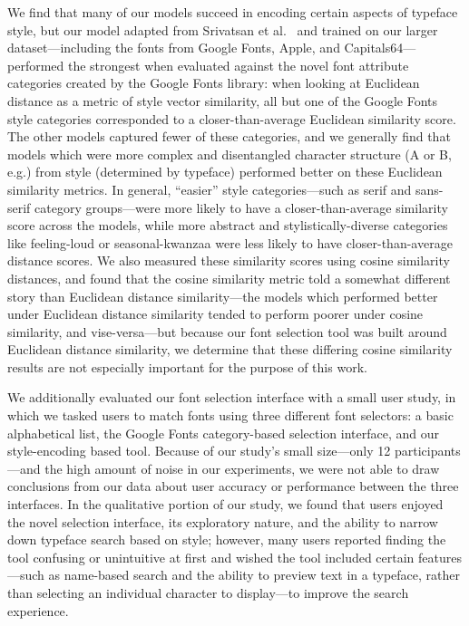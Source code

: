 We find that many of our models succeed in encoding certain aspects of typeface style, but our model adapted from Srivatsan et al.\ \cite{srivatsan2020} and trained on our larger dataset---including the fonts from Google Fonts, Apple, and Capitals64---performed the strongest when evaluated against the novel font attribute categories created by the Google Fonts library: when looking at Euclidean distance as a metric of style vector similarity, all but one of the Google Fonts style categories corresponded to a closer-than-average Euclidean similarity score. The other models captured fewer of these categories, and we generally find that models which were more complex and disentangled character structure (A or B, e.g.) from style (determined by typeface) performed better on these Euclidean similarity metrics. In general, ``easier'' style categories---such as serif and sans-serif category groups---were more likely to have a closer-than-average similarity score across the models, while more abstract and stylistically-diverse categories like feeling-loud or seasonal-kwanzaa were less likely to have closer-than-average distance scores. We also measured these similarity scores using cosine similarity distances, and found that the cosine similarity metric told a somewhat different story than Euclidean distance similarity---the models which performed better under Euclidean distance similarity tended to perform poorer under cosine similarity, and vise-versa---but because our font selection tool was built around Euclidean distance similarity, we determine that these differing cosine similarity results are not especially important for the purpose of this work.

We additionally evaluated our font selection interface with a small user study, in which we tasked users to match fonts using three different font selectors: a basic alphabetical list, the Google Fonts category-based selection interface, and our style-encoding based tool. Because of our study's small size---only 12 participants---and the high amount of noise in our experiments, we were not able to draw conclusions from our data about user accuracy or performance between the three interfaces. In the qualitative portion of our study, we found that users enjoyed the novel selection interface, its exploratory nature, and the ability to narrow down typeface search based on style; however, many users reported finding the tool confusing or unintuitive at first and wished the tool included certain features---such as name-based search and the ability to preview text in a typeface, rather than selecting an individual character to display---to improve the search experience.

